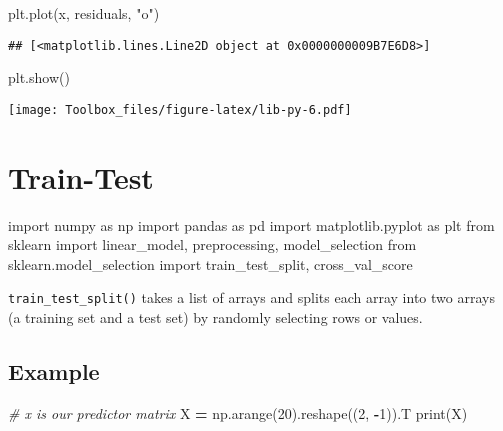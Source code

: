 \documentclass[
]{book}
\newenvironment{Shaded}{\begin{snugshade}}{\end{snugshade}}
\newcommand{\BuiltInTok}[1]{#1}
\newcommand{\CommentTok}[1]{\textcolor[rgb]{0.56,0.35,0.01}{\textit{#1}}}
\newcommand{\DecValTok}[1]{\textcolor[rgb]{0.00,0.00,0.81}{#1}}
\newcommand{\ImportTok}[1]{#1}
\newcommand{\NormalTok}[1]{#1}
\newcommand{\OperatorTok}[1]{\textcolor[rgb]{0.81,0.36,0.00}{\textbf{#1}}}
\newcommand{\StringTok}[1]{\textcolor[rgb]{0.31,0.60,0.02}{#1}}
\begin{document}
\begin{Shaded}
\begin{Highlighting}[]
\NormalTok{plt.plot(x, residuals, }\StringTok{"o"}\NormalTok{)}
\end{Highlighting}
\end{Shaded}

\begin{verbatim}
## [<matplotlib.lines.Line2D object at 0x0000000009B7E6D8>]
\end{verbatim}

\begin{Shaded}
\begin{Highlighting}[]
\NormalTok{plt.show()}
\end{Highlighting}
\end{Shaded}

\texttt{[image: Toolbox\_files/figure-latex/lib-py-6.pdf]}

\hypertarget{train-test}{%
\section{Train-Test}\label{train-test}}

\begin{Shaded}
\begin{Highlighting}[]
\ImportTok{import}\NormalTok{ numpy }\ImportTok{as}\NormalTok{ np}
\ImportTok{import}\NormalTok{ pandas }\ImportTok{as}\NormalTok{ pd}
\ImportTok{import}\NormalTok{ matplotlib.pyplot }\ImportTok{as}\NormalTok{ plt}
\ImportTok{from}\NormalTok{ sklearn }\ImportTok{import}\NormalTok{ linear\_model, preprocessing, model\_selection}
\ImportTok{from}\NormalTok{ sklearn.model\_selection }\ImportTok{import}\NormalTok{ train\_test\_split, cross\_val\_score}
\end{Highlighting}
\end{Shaded}

\texttt{train\_test\_split()} takes a list of arrays and splits each array into two arrays (a training set and a test set) by randomly selecting rows or values.

\hypertarget{example}{%
\subsection{Example}\label{example}}

\begin{Shaded}
\begin{Highlighting}[]
\CommentTok{\# x is our predictor matrix}
\NormalTok{X }\OperatorTok{=}\NormalTok{ np.arange(}\DecValTok{20}\NormalTok{).reshape((}\DecValTok{2}\NormalTok{, }\OperatorTok{{-}}\DecValTok{1}\NormalTok{)).T}
\BuiltInTok{print}\NormalTok{(X)}
\end{Highlighting}
\end{Shaded}
\end{document}
